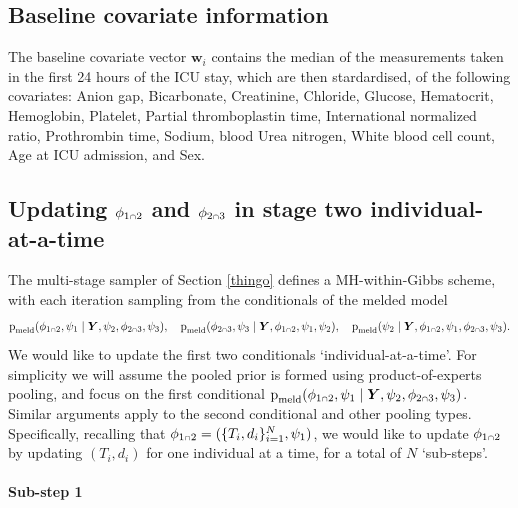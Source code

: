 \documentclass[
  10pt,
  a4paper,
]{article}
\let\Oldcap\cap
\renewcommand{\cap}{\mathrel{\mathsmaller{\Oldcap}}}
\newcommand{\pd}{\text{p}}
\begin{document}
\hypertarget{baseline-covariate-information}{%
\subsection{Baseline covariate
information}\label{baseline-covariate-information}}

The baseline covariate vector \(\boldsymbol{w}_{i}\) contains the median
of the measurements taken in the first 24 hours of the ICU stay, which
are then stardardised, of the following covariates: Anion gap,
Bicarbonate, Creatinine, Chloride, Glucose, Hematocrit, Hemoglobin,
Platelet, Partial thromboplastin time, International normalized ratio,
Prothrombin time, Sodium, blood Urea nitrogen, White blood cell count,
Age at ICU admission, and Sex.

\hypertarget{one-at-a-time}{%
\subsection{\texorpdfstring{Updating \(\phi_{1 \cap 2}\) and
\(\phi_{2 \cap 3}\) in stage two
individual-at-a-time}{Updating \textbackslash phi\_\{1 \textbackslash cap 2\} and \textbackslash phi\_\{2 \textbackslash cap 3\} in stage two individual-at-a-time}}\label{one-at-a-time}}

The multi-stage sampler of Section \ref{thingo} defines a
MH-within-Gibbs scheme, with each iteration sampling from the
conditionals of the melded model \begin{equation}
  \pd_{\text{meld}}(\phi_{1 \cap 2}, \psi_{1} \mid \boldsymbol{Y}, \psi_{2}, \phi_{2 \cap 3}, \psi_{3}), \quad
  \pd_{\text{meld}}(\phi_{2 \cap 3}, \psi_{3} \mid \boldsymbol{Y}, \phi_{1 \cap 2}, \psi_{1}, \psi_{2}), \quad
  \pd_{\text{meld}}(\psi_{2} \mid \boldsymbol{Y}, \phi_{1 \cap 2}, \psi_{1}, \phi_{2 \cap 3}, \psi_{3}).
\end{equation} We would like to update the first two conditionals
`individual-at-a-time'. For simplicity we will assume the pooled prior
is formed using product-of-experts pooling, and focus on the first
conditional
\(\pd_{\text{meld}}(\phi_{1 \cap 2}, \psi_{1} \mid \boldsymbol{Y}, \psi_{2}, \phi_{2 \cap 3}, \psi_{3})\).
Similar arguments apply to the second conditional and other pooling
types. Specifically, recalling that
\(\phi_{1 \cap 2} = (\{T_{i}, d_{i}\}_{i = 1}^{N}, \psi_{1})\), we would
like to update \(\phi_{1 \cap 2}\) by updating \((T_{i}, d_{i})\) for
one individual at a time, for a total of \(N\) `sub-steps'.

\hypertarget{sub-step-1}{%
\paragraph{Sub-step 1}\label{sub-step-1}}
\end{document}
